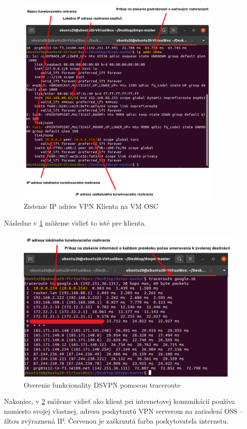 \begin{figure}[!h]
	\centering
	\includegraphics[width=0.9\textwidth]{figures/ipu20}
	\caption{Zistenie IP adries VPN Klienta na VM OSC}
	\label{ipu20}
\end{figure}
Následne v \ref{ipu20} môžeme vidieť to isté pre klienta.
  
\begin{figure}[!h]
	\centering
	\includegraphics[width=1\textwidth]{figures/vpntru20}
	\caption{Overenie funkcionality DSVPN pomocou traceroute}
	\label{vpntru20}
\end{figure}
Nakoniec, v \ref{vpntru20} môžeme vidieť ako klient pri internetovej komunikácií používa namiesto svojej vlastnej, adresu poskytnutú VPN serverom na zariadení OSS -- žltou zvýraznená IP. Červenou je zaškrnutá farba poskytovateľa internetu. 

